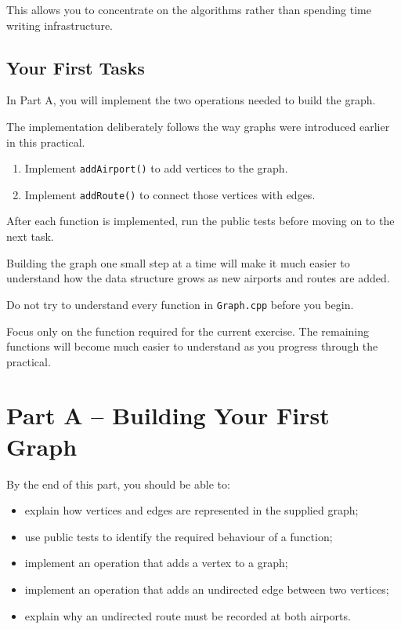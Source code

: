 \documentclass{csc2059practical}
\begin{document}
This allows you to concentrate on the algorithms rather than spending time
writing infrastructure.


\subsection*{Your First Tasks}

In Part A, you will implement the two operations needed to build the graph.

The implementation deliberately follows the way graphs were introduced earlier
in this practical.

\begin{enumerate}
\item Implement \texttt{addAirport()} to add vertices to the graph.
\item Implement \texttt{addRoute()} to connect those vertices with
edges.
\end{enumerate}

After each function is implemented, run the public tests before moving on to the
next task.

Building the graph one small step at a time will make it much easier to
understand how the data structure grows as new airports and routes are added.

\begin{tipbox}
Do not try to understand every function in \texttt{Graph.cpp} before you begin.

Focus only on the function required for the current exercise. The remaining
functions will become much easier to understand as you progress through the
practical.
\end{tipbox}


\section{Part A – Building Your First Graph}

\begin{learningoutcomes}
By the end of this part, you should be able to:

\begin{itemize}
\item explain how vertices and edges are represented in the supplied graph;
\item use public tests to identify the required behaviour of a function;
\item implement an operation that adds a vertex to a graph;
\item implement an operation that adds an undirected edge between two
vertices;
\item explain why an undirected route must be recorded at both airports.
\end{itemize}
\end{learningoutcomes}
\end{document}
